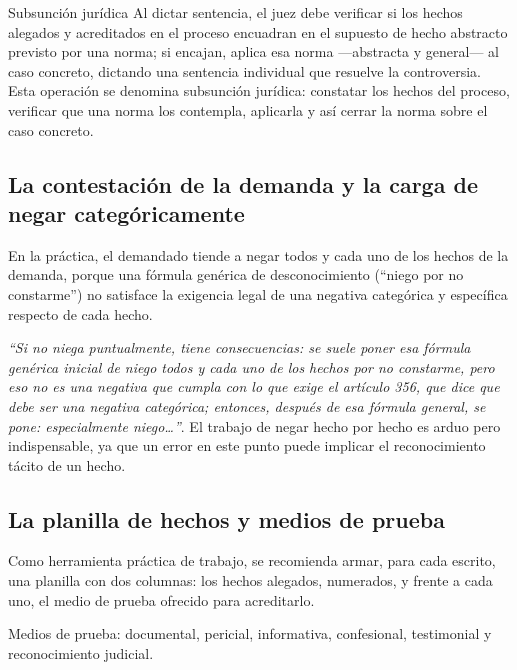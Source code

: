 \documentclass[12pt,oneside]{book}
\begin{document}
\begin{definition}{Subsunción jurídica}
Al dictar sentencia, el juez debe verificar si los hechos alegados y acreditados en el proceso encuadran en el supuesto de hecho abstracto previsto por una norma; si encajan, aplica esa norma —abstracta y general— al caso concreto, dictando una sentencia individual que resuelve la controversia. Esta operación se denomina subsunción jurídica: constatar los hechos del proceso, verificar que una norma los contempla, aplicarla y así cerrar la norma sobre el caso concreto.
\end{definition}

\subsection*{La contestación de la demanda y la carga de negar categóricamente}

En la práctica, el demandado tiende a negar todos y cada uno de los hechos de la demanda, porque una fórmula genérica de desconocimiento (``niego por no constarme'') no satisface la exigencia legal de una negativa categórica y específica respecto de cada hecho.

\begin{important}
\textit{``Si no niega puntualmente, tiene consecuencias: se suele poner esa fórmula genérica inicial de niego todos y cada uno de los hechos por no constarme, pero eso no es una negativa que cumpla con lo que exige el artículo 356, que dice que debe ser una negativa categórica; entonces, después de esa fórmula general, se pone: especialmente niego\dots''}. El trabajo de negar hecho por hecho es arduo pero indispensable, ya que un error en este punto puede implicar el reconocimiento tácito de un hecho.
\end{important}

\subsection*{La planilla de hechos y medios de prueba}

Como herramienta práctica de trabajo, se recomienda armar, para cada escrito, una planilla con dos columnas: los hechos alegados, numerados, y frente a cada uno, el medio de prueba ofrecido para acreditarlo.

\begin{note}
Medios de prueba: documental, pericial, informativa, confesional, testimonial y reconocimiento judicial.
\end{note}
\end{document}
